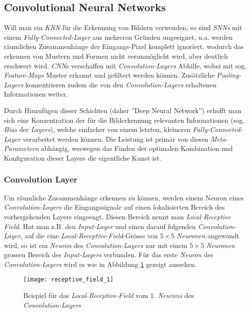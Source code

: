 \subsection{Convolutional Neural Networks}\label{cha:theo:cnn}
Will man ein \textit{KNN} für die Erkennung von Bildern verwenden, so sind \textit{SNNs} mit einem \textit{Fully-Connected-Layer} aus mehreren Gründen ungeeignet, u.a. werden räumlichen Zusammenhänge der Eingangs-Pixel komplett ignoriert, wodurch das erkennen von Mustern und Formen nicht verunmöglicht wird, aber deutlich erschwert wird. \textit{CNN}s verschaffen mit \textit{Convolution-Layers} Abhilfe, wobei mit sog. \textit{Feature-Maps} Muster erkannt und gefiltert werden können. Zusätzliche \textit{Pooling-Layers} konzentrieren zudem die von den \textit{Convolution-Layers} erhaltenen Informationen weiter.

Durch Hinzufügen dieser Schichten (daher ''Deep Neural Network'') erhofft man sich eine Konzentration der für die Bilderkennung relevanten Informationen (sog. \textit{Bias} der \textit{Layers}), welche einfacher von einem letzten, kleineren \textit{Fully-Connected-Layer} verarbeitet werden können. Die Leistung ist primär von diesen \textit{Meta-Parametern} abhängig, weswegen das Finden der optimalen Kombination und Konfiguration dieser Layers die eigentliche Kunst ist.

\subsubsection{Convolution Layer}
Um räumliche Zusammenhänge erkennen zu können, werden einem Neuron eines \textit{Convolution-Layers} die Eingangssignale auf einen lokalisierten Bereich des vorhergehenden Layers eingeengt. Diesen Bereich nennt man \textit{Local Receptive Field}. Hat man z.B. den \textit{Input-Layer} und einen darauf folgenden \textit{Convolution-Layer}, auf die eine \textit{Local-Receptive-Field}-Grösse von $5\times 5$ \textit{Neuronen} angewandt wird, so ist ein \textit{Neuron} des \textit{Convolution-Layers} nur mit einem $5\times 5$ \textit{Neuronen} grossen Bereich des \textit{Input-Layers} verbunden. Für das erste \textit{Neuron} des \textit{Convolution-Layers} wird es wie in Abbildung \ref{img:rec_field1} gezeigt aussehen.

\begin{figure}[h]
	\ContinuedFloat*
	\centering
	\texttt{[image: receptive\_field\_1]}
	\caption[Beispiel für das \textit{Local-Receptive-Field} 1. \textit{Neuron}]{Beispiel für das \textit{Local-Receptive-Field} vom 1. \textit{Neurons} des \textit{Convolution-Layers}}
	\label{img:rec_field1}
\end{figure}

